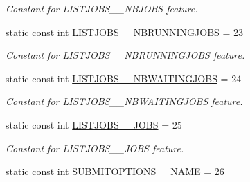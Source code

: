 \begin{DoxyCompactItemize}
\begin{DoxyCompactList}\small\item\em Constant for LISTJOBS\_\-\_\-NBJOBS feature. \item\end{DoxyCompactList}\item 
\hypertarget{classTMS__Data_1_1TMS__DataPackage_a21263d75ab47361d078a55a672800cc0}{
static const int \hyperlink{classTMS__Data_1_1TMS__DataPackage_a21263d75ab47361d078a55a672800cc0}{LISTJOBS\_\-\_\-NBRUNNINGJOBS} = 23}
\label{classTMS__Data_1_1TMS__DataPackage_a21263d75ab47361d078a55a672800cc0}

\begin{DoxyCompactList}\small\item\em Constant for LISTJOBS\_\-\_\-NBRUNNINGJOBS feature. \item\end{DoxyCompactList}\item 
\hypertarget{classTMS__Data_1_1TMS__DataPackage_ae682450b11abf19afc1e3921ce9b323a}{
static const int \hyperlink{classTMS__Data_1_1TMS__DataPackage_ae682450b11abf19afc1e3921ce9b323a}{LISTJOBS\_\-\_\-NBWAITINGJOBS} = 24}
\label{classTMS__Data_1_1TMS__DataPackage_ae682450b11abf19afc1e3921ce9b323a}

\begin{DoxyCompactList}\small\item\em Constant for LISTJOBS\_\-\_\-NBWAITINGJOBS feature. \item\end{DoxyCompactList}\item 
\hypertarget{classTMS__Data_1_1TMS__DataPackage_a6731f5e6ffe6a958aa6c79a85548cf3e}{
static const int \hyperlink{classTMS__Data_1_1TMS__DataPackage_a6731f5e6ffe6a958aa6c79a85548cf3e}{LISTJOBS\_\-\_\-JOBS} = 25}
\label{classTMS__Data_1_1TMS__DataPackage_a6731f5e6ffe6a958aa6c79a85548cf3e}

\begin{DoxyCompactList}\small\item\em Constant for LISTJOBS\_\-\_\-JOBS feature. \item\end{DoxyCompactList}\item 
\hypertarget{classTMS__Data_1_1TMS__DataPackage_a7034a2c81d4d2d922aff633fed582585}{
static const int \hyperlink{classTMS__Data_1_1TMS__DataPackage_a7034a2c81d4d2d922aff633fed582585}{SUBMITOPTIONS\_\-\_\-NAME} = 26}
\label{classTMS__Data_1_1TMS__DataPackage_a7034a2c81d4d2d922aff633fed582585}


\end{DoxyCompactItemize}
